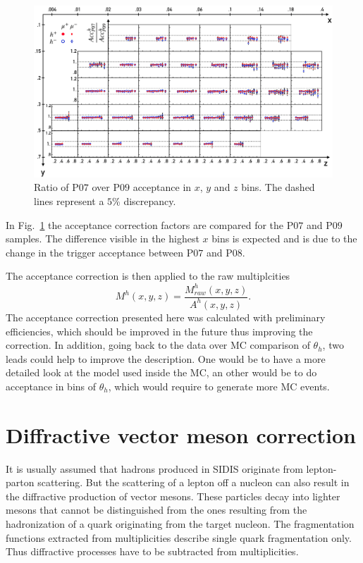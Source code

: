 \begin{figure}
  \centering
	\includegraphics[scale=0.7]{./gfx/SysAcc.png}
	\caption{Ratio of P$07$ over P$09$ acceptance in $x$, $y$ and $z$ bins. The dashed lines represent a $5$\% discrepancy.}
	\label{pic:AccPer}
\end{figure}

In Fig.~\ref{pic:AccPer} the acceptance correction factors are compared for the P$07$ and P$09$ samples. The difference visible in the highest $x$ bins is expected and is due to the change in the trigger acceptance between P$07$ and P$08$.

The acceptance correction is then applied to the raw multiplcities
%
\begin{equation}
  M^h(x,y,z) = \frac{M^h_{raw}(x,y,z)}{A^h(x,y,z)}.
\end{equation}
%
The acceptance correction presented here was calculated with preliminary efficiencies, which should be improved in the future thus improving the correction. In addition, going back to the data over MC comparison of $\theta_h$, two leads could help to improve the description. One would be to have a more detailed look at the model used inside the MC, an other would be to do acceptance in bins of $\theta_h$, which would require to generate more MC events.

\section{Diffractive vector meson correction} \label{sec:DVMf}

It is usually assumed that hadrons produced in SIDIS originate from lepton-parton scattering. But the scattering of a lepton off a nucleon can also result in the diffractive production of vector mesons. These particles decay into lighter mesons that cannot be distinguished from the ones resulting from the hadronization of a quark originating from the target nucleon. The fragmentation functions extracted from multiplicities describe single quark fragmentation only. Thus diffractive processes have to be subtracted from multiplicities.

